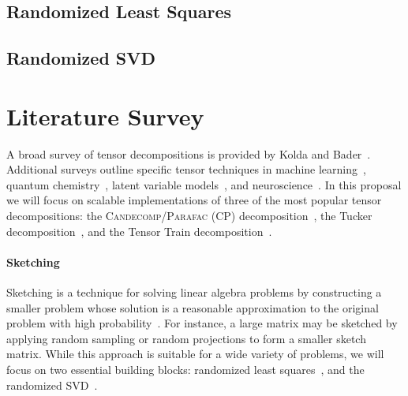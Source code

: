 \subsection{Randomized Least Squares}
\subsection{Randomized SVD}
%
%
%
%
%
%
%
\section{Literature Survey}
A broad survey of tensor decompositions is provided by Kolda and Bader~\cite{Kolda:2009}. Additional surveys outline specific tensor techniques in machine learning~\cite{nikossurvey}, quantum chemistry~\cite{quantumsurvey}, latent variable models~\cite{Anandk}, and neuroscience~\cite{eegsurvey}. In this proposal we will focus on scalable implementations of three of the most popular tensor decompositions: the \textsc{Candecomp/Parafac} (CP) decomposition~\cite{hitchcock-sum-1927, CANDECOMP, PARAFAC}, the Tucker decomposition~\cite{Tu66}, and the Tensor Train decomposition~\cite{tensortrain}. 

\paragraph{Sketching}
Sketching is a technique for solving linear algebra problems by constructing a smaller problem whose solution is a reasonable approximation to the original problem with high probability~\cite{sketching}. For instance, a large matrix may be sketched by applying random sampling or random projections to form a smaller sketch matrix. While this approach is suitable for a wide variety of problems, we will focus on two essential building blocks: randomized least squares~\cite{rokhlintygert,DrMaMuSa11,blendenpik}, and the randomized SVD~\cite{halko}. 


